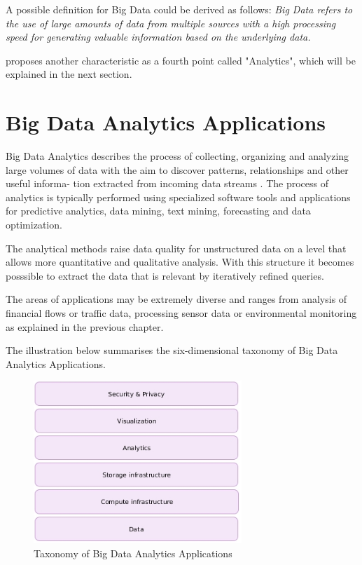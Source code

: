 A possible definition for Big Data could be derived as follows: \textit{Big Data refers to the use
of large amounts of data from multiple sources with a high processing speed for generating
valuable information based on the underlying data.}

\cite{Bitk12} proposes another characteristic as a fourth point called "Analytics", which will
be explained in the next section.

\section{Big Data Analytics Applications}


Big Data Analytics describes the process of collecting, organizing and analyzing large
volumes of data with the aim to discover patterns, relationships and other useful informa-
tion extracted from incoming data streams \cite{Marz15}. The process of analytics is typically
performed using specialized software tools and applications for predictive analytics, data
mining, text mining, forecasting and data optimization.

The analytical methods raise data quality for unstructured data on a level that allows
more quantitative and qualitative analysis. With this structure it becomes posssible
to extract the data that is relevant by iteratively refined queries.

The areas of applications may be extremely diverse and ranges from analysis of financial
flows or traffic data, processing sensor data or environmental monitoring as explained in
the previous chapter.

The illustration below summarises the six-dimensional taxonomy \cite{Bitk14, Csa14} of Big
Data Analytics Applications.
\begin{figure}[H]
	\centering
	\includegraphics[width=0.7\textwidth]{../images/05-big-data-taxonomy.jpg}
	\caption{Taxonomy of Big Data Analytics Applications \cite{Bitk14, Csa14}}
	\label{taxonomy-bigdata-applications}
\end{figure}

